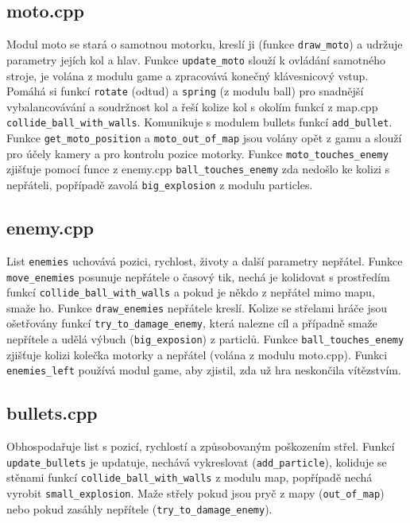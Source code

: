 \documentclass{article}
\begin{document}
\subsection{moto.cpp}
Modul moto se stará o samotnou motorku, kreslí ji (funkce \texttt{draw\_moto}) a udržuje parametry jejích kol a hlav. Funkce \texttt{update\_moto} slouží k ovládání samotného stroje, je volána z modulu game a zpracovává konečný klávesnicový vstup. Pomáhá si funkcí \texttt{rotate} (odtud) a \texttt{spring} (z modulu ball) pro snadnější vybalancovávání a soudržnost kol a řeší kolize kol s okolím funkcí z map.cpp \texttt{collide\_ball\_with\_walls}. Komunikuje s modulem bullets funkcí \texttt{add\_bullet}.
Funkce \texttt{get\_moto\_position} a \texttt{moto\_out\_of\_map} jsou volány opět z gamu a slouží pro účely kamery a pro kontrolu pozice motorky.
Funkce \texttt{moto\_touches\_enemy} zjišťuje pomocí funce z enemy.cpp \texttt{ball\_touches\_enemy} zda nedošlo ke kolizi s nepřáteli, popřípadě zavolá \texttt{big\_explosion} z modulu particles.

\subsection{enemy.cpp}
List \texttt{enemies} uchovává pozici, rychlost, životy a další
parametry nepřátel. Funkce \texttt{move\_enemies} posunuje nepřátele o časový tik, nechá je kolidovat s prostředím funkcí \texttt{collide\_ball\_with\_walls} a pokud je někdo z nepřátel mimo mapu, smaže ho. Funkce \texttt{draw\_enemies} nepřátele kreslí. Kolize se střelami hráče jsou ošetřovány funkcí \texttt{try\_to\_damage\_enemy}, která nalezne cíl a případně smaže nepřítele a udělá výbuch (\texttt{big\_exposion}) z particlů. Funkce \texttt{ball\_touches\_enemy} zjišťuje kolizi kolečka motorky a nepřátel (volána z modulu moto.cpp). Funkci \texttt{enemies\_left} používá modul game, aby zjistil, zda už hra neskončila vítězstvím.

\subsection{bullets.cpp}
Obhospodařuje list s pozicí, rychlostí a způsobovaným poškozením střel. Funkcí \texttt{update\_bullets} je updatuje, nechává vykreslovat (\texttt{add\_particle}), koliduje se stěnami funkcí \texttt{collide\_ball\_with\_walls} z modulu map, popřípadě nechá vyrobit \texttt{small\_explosion}. Maže střely pokud jsou pryč z mapy (\texttt{out\_of\_map}) nebo pokud zasáhly nepřítele (\texttt{try\_to\_damage\_enemy}).
\end{document}
